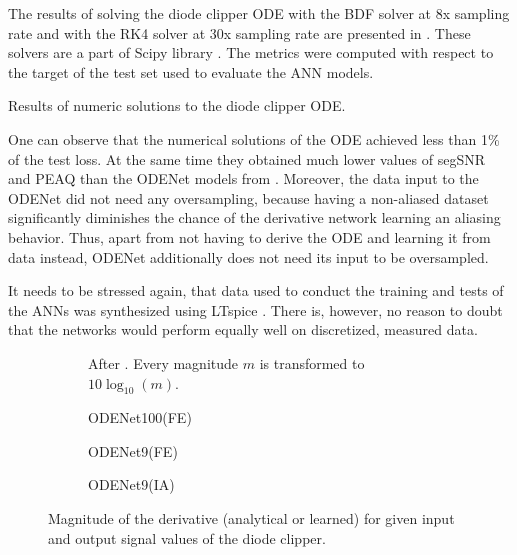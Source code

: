 The results of solving the diode clipper \ac{ODE} with the \ac{BDF} solver at 8x sampling rate and with the \ac{RK}4 solver at 30x sampling rate are presented in . These solvers are a part of Scipy library \cite{SciPy}. The metrics were computed with respect to the target of the test set used to evaluate the \ac{ANN} models.

\begin{table}[]
    \centering
    \caption{Results of numeric solutions to the diode clipper \ac{ODE}.}
    
    \label{tab:diode_clipper_ode_solvers}
\end{table}

One can observe that the numerical solutions of the \ac{ODE} achieved less than 1\% of the test loss. At the same time they obtained much lower values of \ac{segSNR} and \ac{PEAQ} than the ODENet models from . Moreover, the data input to the ODENet did not need any oversampling, because having a non-aliased dataset significantly diminishes the chance of the derivative network learning an aliasing behavior. Thus, apart from not having to derive the \ac{ODE} and learning it from data instead, ODENet additionally does not need its input to be oversampled.

It needs to be stressed again, that data used to conduct the training and tests of the \acp{ANN} was synthesized using LTspice \cite{LTspice}. There is, however, no reason to doubt that the networks would perform equally well on discretized, measured data.

\newcommand{\subfigureWidth}{0.4\textwidth}
\newcommand{\subfigureScale}{0.8}

\begin{figure}
    \centering
    \begin{subfigure}{0.9\textwidth}
        \centering
        \scalebox{\subfigureScale}{}
        \caption{After . Every magnitude $m$ is transformed to $10 \log_{10}(m)$.}
    \end{subfigure}
    \begin{subfigure}{0.9\textwidth}
        \centering
        \scalebox{\subfigureScale}{}
        \caption{ODENet100(FE)}
    \end{subfigure}
    \begin{subfigure}{\subfigureWidth}
        \scalebox{0.75}{}
        \caption{ODENet9(FE)}
    \end{subfigure}
    \begin{subfigure}{\subfigureWidth}
        \scalebox{0.76}{}
        \caption{ODENet9(IA)}
    \end{subfigure}
    \caption{Magnitude of the derivative (analytical or learned) for given input and output signal values of the diode clipper.}
    \label{fig:diode_clipper_derivative_visualizations}
\end{figure}

